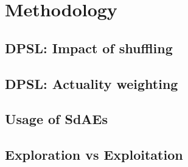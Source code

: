 \section{Methodology}

\subsection{DPSL: Impact of shuffling}

\subsection{DPSL: Actuality weighting}

\subsection{Usage of SdAEs}

\subsection{Exploration vs Exploitation}



